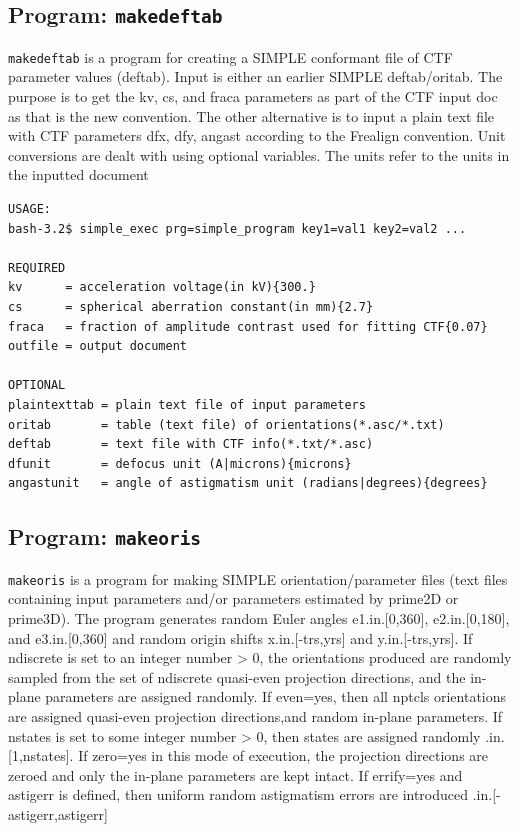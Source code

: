 \documentclass[a4paper,11pt]{article}
\newcommand{\prgname}[1]{\textcolor{NavyBlue}{\texttt{#1}}}
\begin{document}
\subsection{Program: \prgname{makedeftab}}
\label{makedeftab}
\prgname{makedeftab} is a program for creating a SIMPLE conformant file of CTF parameter values (deftab). Input is either an earlier SIMPLE deftab/oritab. The purpose is to get the kv, cs, and fraca parameters as part of the CTF input doc as that is the new convention. The other alternative is to input a plain text file with CTF parameters dfx, dfy, angast according to the Frealign convention. Unit conversions are dealt with using optional variables. The units refer to the units in the inputted document

\begin{verbatim}
USAGE:
bash-3.2$ simple_exec prg=simple_program key1=val1 key2=val2 ...

REQUIRED
kv      = acceleration voltage(in kV){300.}
cs      = spherical aberration constant(in mm){2.7}
fraca   = fraction of amplitude contrast used for fitting CTF{0.07}
outfile = output document

OPTIONAL
plaintexttab = plain text file of input parameters
oritab       = table (text file) of orientations(*.asc/*.txt)
deftab       = text file with CTF info(*.txt/*.asc)
dfunit       = defocus unit (A|microns){microns}
angastunit   = angle of astigmatism unit (radians|degrees){degrees}
\end{verbatim}

\subsection{Program: \prgname{makeoris}}
\label{makeoris}
\prgname{makeoris} is a program for making SIMPLE orientation/parameter files (text files containing input parameters and/or parameters estimated by prime2D or prime3D). The program generates random Euler angles e1.in.[0,360], e2.in.[0,180], and e3.in.[0,360] and random origin shifts x.in.[-trs,yrs] and y.in.[-trs,yrs]. If ndiscrete is set to an integer number > 0, the orientations produced are randomly sampled from the set of ndiscrete quasi-even projection directions, and the in-plane parameters are assigned randomly. If even=yes, then all nptcls orientations are assigned quasi-even projection directions,and random in-plane parameters. If nstates is set to some integer number > 0, then states are assigned randomly .in.[1,nstates]. If zero=yes in this mode of execution, the projection directions are zeroed and only the in-plane parameters are kept intact. If errify=yes and astigerr is defined, then uniform random astigmatism errors are introduced .in.[-astigerr,astigerr]
\end{document}
